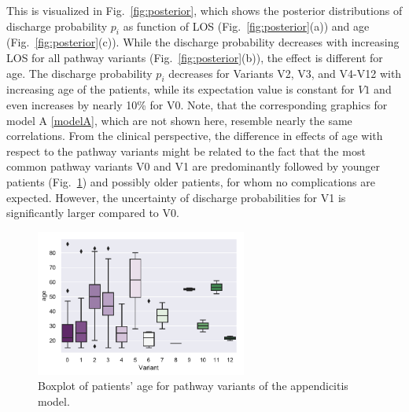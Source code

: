 This is visualized in Fig.~\ref{fig:posterior}, which shows the posterior distributions of discharge probability $p_i$ as function of LOS (Fig.~\ref{fig:posterior}(a)) and age (Fig.~\ref{fig:posterior}(c)). While the discharge probability decreases with increasing LOS for all pathway variants (Fig.~\ref{fig:posterior}(b)), the effect is different for age. 
The discharge probability $p_i$ decreases for Variants V2, V3, and V4-V12 with increasing age of the patients, while its expectation value is constant for $V1$ and even increases by nearly 10\% for V0. Note, that the corresponding graphics for model A \eqref{modelA}, which are not shown here, resemble nearly the same correlations. 
From the clinical perspective, the difference in effects of age with
respect to the pathway variants might be related to the fact that the
most common pathway variants V0 and V1 are predominantly followed by younger patients (Fig.~\ref{Fig:boxplot}) and possibly older patients, for whom no complications are expected. 
However, the uncertainty of discharge probabilities for V1 is significantly larger compared to V0.

\begin{figure}
  \centering
  \includegraphics[width=0.618\textwidth]{images/DS19fA0_Lin20180730a__boxplot_age_variant.pdf}
\caption{Boxplot of patients' age for pathway variants of the
  appendicitis model.}
\label{Fig:boxplot}
\end{figure}
%


